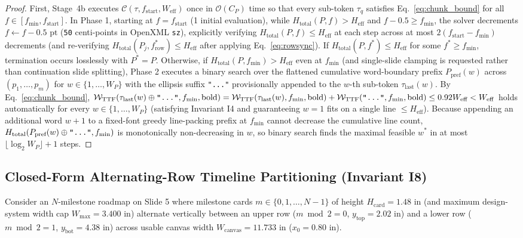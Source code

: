 \documentclass[10pt,journal,compsoc]{IEEEtran}
\begin{document}
\begin{proof}
First, Stage~4b executes $\mathcal{C}(\tau, f_{\text{start}}, W_{\text{eff}})$ once in $\mathcal{O}(C_P)$ time so that every sub-token $\tau_q$ satisfies Eq.~\eqref{eq:chunk_bound} for all $f \in [f_{\min}, f_{\text{start}}]$. In Phase 1, starting at $f = f_{\text{start}}$ (1 initial evaluation), while $H_{\text{total}}(P, f) > H_{\text{eff}}$ and $f - 0.5 \ge f_{\min}$, the solver decrements $f \leftarrow f - 0.5\text{ pt}$ (\texttt{50} centi-points in OpenXML \texttt{sz}), explicitly verifying $H_{\text{total}}(P, f) \le H_{\text{eff}}$ at each step across at most $2(f_{\text{start}} - f_{\min})$ decrements (and re-verifying $H_{\text{total}}(P_j, f^*_{\text{row}}) \le H_{\text{eff}}$ after applying Eq.~\eqref{eq:rowsync}). If $H_{\text{total}}(P, f^*) \le H_{\text{eff}}$ for some $f^* \ge f_{\min}$, termination occurs losslessly with $P^* = P$. Otherwise, if $H_{\text{total}}(P, f_{\min}) > H_{\text{eff}}$ even at $f_{\min}$ (and single-slide clamping is requested rather than continuation slide splitting), Phase 2 executes a binary search over the flattened cumulative word-boundary prefix $P_{\text{pref}}(w)$ across $(p_1, \dots, p_m)$ for $w \in \{1, \dots, W_P\}$ with the ellipsis suffix \texttt{"..."} provisionally appended to the $w$-th sub-token $\tau_{\text{last}}(w)$. By Eq.~\eqref{eq:chunk_bound}, $\mathcal{W}_{\text{TTF}}(\tau_{\text{last}}(w) \oplus \text{\texttt{"..."}}, f_{\min}, \text{bold}) = \mathcal{W}_{\text{TTF}}(\tau_{\text{last}}(w), f_{\min}, \text{bold}) + \mathcal{W}_{\text{TTF}}(\text{\texttt{"..."}}, f_{\min}, \text{bold}) \le 0.92 W_{\text{eff}} < W_{\text{eff}}$ holds automatically for every $w \in \{1, \dots, W_P\}$ (satisfying Invariant I4 and guaranteeing $w = 1$ fits on a single line $\le H_{\text{eff}}$). Because appending an additional word $w+1$ to a fixed-font greedy line-packing prefix at $f_{\min}$ cannot decrease the cumulative line count, $H_{\text{total}}(P_{\text{pref}}(w) \oplus \text{\texttt{"..."}}, f_{\min})$ is monotonically non-decreasing in $w$, so binary search finds the maximal feasible $w^*$ in at most $\lfloor \log_2 W_P \rfloor + 1$ steps.
\end{proof}

\subsection{Closed-Form Alternating-Row Timeline Partitioning (Invariant I8)}
\label{sec:timeline}
Consider an $N$-milestone roadmap on Slide 5 where milestone cards $m \in \{0, 1, \dots, N-1\}$ of height $H_{\text{card}} = 1.48\text{ in}$ (and maximum design-system width cap $W_{\max} = 3.400\text{ in}$) alternate vertically between an upper row ($m \bmod 2 = 0$, $y_{\text{top}} = 2.02\text{ in}$) and a lower row ($m \bmod 2 = 1$, $y_{\text{bot}} = 4.38\text{ in}$) across usable canvas width $W_{\text{canvas}} = 11.733\text{ in}$ ($x_0 = 0.80\text{ in}$).
\end{document}
